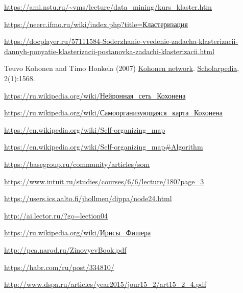 \documentclass[a4paper,12pt]{article}
\begin{document}
\begin{thebibliography}{9}
    \url{https://ami.nstu.ru/~vms/lecture/data_mining/kurs_klaster.htm}

    \href{https://neerc.ifmo.ru/wiki/index.php?title=\%D0\%9A\%D0\%BB\%D0\%B0\%D1\%81\%D1\%82\%D0\%B5\%D1\%80\%D0\%B8\%D0\%B7\%D0\%B0\%D1\%86\%D0\%B8\%D1\%8F}
    {https://neerc.ifmo.ru/wiki/index.php?title=Кластеризация}

    \url{https://docplayer.ru/57111584-Soderzhanie-vvedenie-zadacha-klasterizacii-dannyh-ponyatie-klasterizacii-postanovka-zadachi-klasterizacii.html}

    Teuvo Kohonen and Timo Honkela (2007)
    \href{http://www.scholarpedia.org/article/Kohonen_network}{Kohonen network}.
    \href{http://www.scholarpedia.org/}{Scholarpedia},
    2(1):1568.

    \href{https://ru.wikipedia.org/wiki/\%D0\%9D\%D0\%B5\%D0\%B9\%D1\%80\%D0\%BE\%D0\%BD\%D0\%BD\%D0\%B0\%D1\%8F\_\%D1\%81\%D0\%B5\%D1\%82\%D1\%8C\_\%D0\%9A\%D0\%BE\%D1\%85\%D0\%BE\%D0\%BD\%D0\%B5\%D0\%BD\%D0\%B0}
    {https://ru.wikipedia.org/wiki/Нейронная\_сеть\_Кохонена}

    \href{https://ru.wikipedia.org/wiki/\%D0\%A1\%D0\%B0\%D0\%BC\%D0\%BE\%D0\%BE\%D1\%80\%D0\%B3\%D0\%B0\%D0\%BD\%D0\%B8\%D0\%B7\%D1\%83\%D1\%8E\%D1\%89\%D0\%B0\%D1\%8F\%D1\%81\%D1\%8F_\%D0\%BA\%D0\%B0\%D1\%80\%D1\%82\%D0\%B0_\%D0\%9A\%D0\%BE\%D1\%85\%D0\%BE\%D0\%BD\%D0\%B5\%D0\%BD\%D0\%B0}
    {https://ru.wikipedia.org/wiki/Самоорганизующаяся\_карта\_Кохонена}

    \href{https://en.wikipedia.org/wiki/Self-organizing\_map}{https://en.wikipedia.org/wiki/Self-organizing\_map}

    \href{https://en.wikipedia.org/wiki/Self-organizing\_map\#Algorithm}
    {https://en.wikipedia.org/wiki/Self-organizing\_map\#Algorithm}

    \href{https://basegroup.ru/community/articles/som}{https://basegroup.ru/community/articles/som}

    \href{https://www.intuit.ru/studies/courses/6/6/lecture/180?page=3}{https://www.intuit.ru/studies/courses/6/6/lecture/180?page=3}
  
    \url{https://users.ics.aalto.fi/jhollmen/dippa/node24.html}

    \url{http://ai.lector.ru/?go=lection04}
  
    \href{https://ru.wikipedia.org/wiki/\%D0\%98\%D1\%80\%D0\%B8\%D1\%81\%D1\%8B_\%D0\%A4\%D0\%B8\%D1\%88\%D0\%B5\%D1\%80\%D0\%B0}
         {https://ru.wikipedia.org/wiki/Ирисы\_Фишера}

    \url{http://pca.narod.ru/ZinovyevBook.pdf}
  
    \url{https://habr.com/ru/post/334810/}

    \url{http://www.dspa.ru/articles/year2015/jour15_2/art15_2_4.pdf}
\end{thebibliography}
\end{document}
